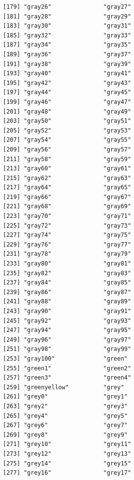 \documentclass[a4paperpaper,]{article}
\begin{document}
\begin{verbatim}
[179] "gray26"               "gray27"              
[181] "gray28"               "gray29"              
[183] "gray30"               "gray31"              
[185] "gray32"               "gray33"              
[187] "gray34"               "gray35"              
[189] "gray36"               "gray37"              
[191] "gray38"               "gray39"              
[193] "gray40"               "gray41"              
[195] "gray42"               "gray43"              
[197] "gray44"               "gray45"              
[199] "gray46"               "gray47"              
[201] "gray48"               "gray49"              
[203] "gray50"               "gray51"              
[205] "gray52"               "gray53"              
[207] "gray54"               "gray55"              
[209] "gray56"               "gray57"              
[211] "gray58"               "gray59"              
[213] "gray60"               "gray61"              
[215] "gray62"               "gray63"              
[217] "gray64"               "gray65"              
[219] "gray66"               "gray67"              
[221] "gray68"               "gray69"              
[223] "gray70"               "gray71"              
[225] "gray72"               "gray73"              
[227] "gray74"               "gray75"              
[229] "gray76"               "gray77"              
[231] "gray78"               "gray79"              
[233] "gray80"               "gray81"              
[235] "gray82"               "gray83"              
[237] "gray84"               "gray85"              
[239] "gray86"               "gray87"              
[241] "gray88"               "gray89"              
[243] "gray90"               "gray91"              
[245] "gray92"               "gray93"              
[247] "gray94"               "gray95"              
[249] "gray96"               "gray97"              
[251] "gray98"               "gray99"              
[253] "gray100"              "green"               
[255] "green1"               "green2"              
[257] "green3"               "green4"              
[259] "greenyellow"          "grey"                
[261] "grey0"                "grey1"               
[263] "grey2"                "grey3"               
[265] "grey4"                "grey5"               
[267] "grey6"                "grey7"               
[269] "grey8"                "grey9"               
[271] "grey10"               "grey11"              
[273] "grey12"               "grey13"              
[275] "grey14"               "grey15"              
[277] "grey16"               "grey17"              

\end{verbatim}
\end{document}
